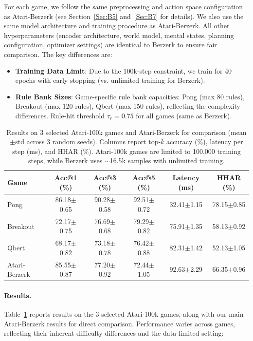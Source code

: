 \documentclass{article} %
\newcommand{\revise}[1]{#1}
\begin{document}
\revise{For each game, we follow the same preprocessing and action space configuration as Atari-Berzerk (see Section~\ref{Sec:B5} and~\ref{Sec:B7} for details). We also use the same model architecture and training procedure as Atari-Berzerk. All other hyperparameters (encoder architecture, world model, mental states, planning configuration, optimizer settings) are identical to Berzerk to ensure fair comparison. The key differences are:}
\revise{\begin{itemize}
    \item \textbf{Training Data Limit}: Due to the 100k-step constraint, we train for 40 epochs with early stopping (vs. unlimited training for Berzerk).
    \item \textbf{Rule Bank Sizes}: Game-specific rule bank capacities: Pong (max 80 rules), Breakout (max 120 rules), Qbert (max 150 rules), reflecting the complexity differences. Rule-hit threshold $\tau_r=0.75$ for all games (same as Berzerk).
\end{itemize}}
\begin{table}[!t]
\centering
\small
\caption{Results on 3 selected Atari-100k games and Atari-Berzerk for comparison (mean$\pm$std across 3 random seeds). Columns report top-$k$ accuracy (\%), latency per step (ms), and HHAR (\%). Atari-100k games are limited to 100,000 training steps, while Berzerk uses $\sim$16.5k samples with unlimited training.}
\label{tab:atari100k_results}
\begin{tabular}{lccccc}
\toprule
\textbf{Game} & Acc@1 (\%) & Acc@3 (\%) & Acc@5 (\%) & Latency (ms) & HHAR (\%) \\
\midrule
Pong & 86.18$\pm$0.65 & 90.28$\pm$0.58 & 92.51$\pm$0.72 & 32.41$\pm$1.15 & 78.15$\pm$0.85 \\
Breakout & 72.17$\pm$0.75 & 76.69$\pm$0.68 & 79.29$\pm$0.82 & 75.91$\pm$1.35 & 58.13$\pm$0.92 \\
Qbert & 68.17$\pm$0.82 & 73.18$\pm$0.78 & 76.42$\pm$0.88 & 82.31$\pm$1.42 & 52.13$\pm$1.05 \\
\midrule
Atari-Berzerk & 85.55$\pm$0.87 & 77.20$\pm$0.92 & 72.44$\pm$1.05 & 92.63$\pm$2.29 & 66.35$\pm$0.96 \\
\bottomrule
\end{tabular}
\end{table}
\revise{\paragraph{Results.}
Table~\ref{tab:atari100k_results} reports results on the 3 selected Atari-100k games, along with our main Atari-Berzerk results for direct comparison. Performance varies across games, reflecting their inherent difficulty differences and the data-limited setting:}
\end{document}
